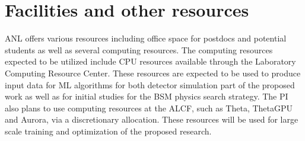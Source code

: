 \documentclass[letter, USenglish, 11pt, subfigure]{article}
\begin{document}



\clearpage

\printbibliography
\clearpage

\section{Facilities and  other resources}
ANL offers various resources including office space for postdocs and potential students as well as several computing resources. The computing resources expected to be utilized include CPU resources available through the Laboratory Computing Resource Center. These resources are expected to be used to produce input data for ML algorithms for both detector simulation part of the proposed work as well as for initial studies for the BSM physics search strategy. The PI also plans to use computing resources at the ALCF, such as Theta, ThetaGPU and Aurora, via a discretionary allocation. These resources will be used for large scale training and optimization of the proposed research.
\end{document}
